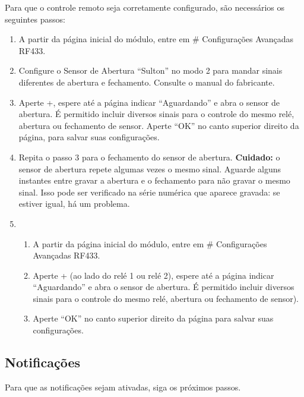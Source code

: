 Para que o controle remoto seja corretamente configurado, são necessários os seguintes passos:
\begin{enumerate}
    \item
    A partir da página inicial do módulo, entre em \# \textrightarrow{} Configurações Avançadas \textrightarrow{} RF433.

    \item
    Configure o Sensor de Abertura “Sulton” no modo 2 para mandar sinais diferentes de abertura e fechamento. Consulte o manual do fabricante.

    \item
    Aperte +, espere até a página indicar “Aguardando” e abra o sensor de abertura. É permitido incluir diversos sinais para o controle do mesmo relé, abertura ou fechamento de sensor. Aperte “OK” no canto superior direito da página, para salvar suas configurações.

    \item
    Repita o passo 3 para o fechamento do sensor de abertura. \textbf{Cuidado:} o sensor de abertura repete algumas vezes o mesmo sinal. Aguarde alguns instantes entre gravar a abertura e o fechamento para não gravar o mesmo sinal. Isso pode ser verificado na série numérica que aparece gravada: se estiver igual, há um problema.

    \item
        \begin{enumerate}
            \item
            A partir da página inicial do módulo, entre em \# \textrightarrow{} Configurações Avançadas \textrightarrow{} RF433.

            \item
            Aperte + (ao lado do relé 1 ou relé 2), espere até a página indicar “Aguardando” e abra o sensor de abertura. É permitido incluir diversos sinais para o controle do mesmo relé, abertura ou fechamento de sensor).

            \item
            Aperte ``OK'' no canto superior direito da página para salvar suas configurações.

        \end{enumerate}
\end{enumerate}

\subsection{Notificações}
Para que as notificações sejam ativadas, siga os próximos passos.

